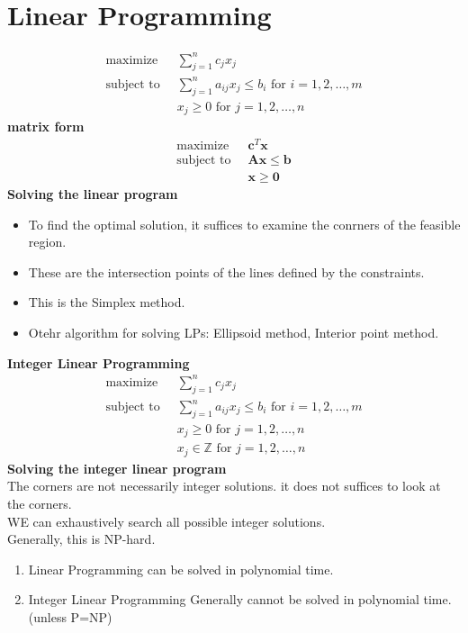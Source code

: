 \documentclass[onecolumn]{report}
\begin{document}
\section{Linear Programming}
\begin{align*}
    \text{maximize  } \:& \sum_{j=1}^n c_jx_j\\
    \text{subject to  } \:& \sum_{j=1}^n a_{ij}x_j \leq b_i \text{ for } i=1, 2, \dots, m\\
    & x_j \geq 0 \text{ for } j=1, 2, \dots, n
\end{align*}
\textbf{matrix form}
\begin{align*}
    \text{maximize  } \:& \mathbf{c}^T\mathbf{x}\\
    \text{subject to  } \:& \mathbf{Ax} \leq \mathbf{b}\\
    & \mathbf{x} \geq \mathbf{0}
\end{align*}
\noindent
\textbf{Solving the linear program}
\begin{itemize}
    \item To find the optimal solution, it suffices to examine the conrners of the feasible region.
    \item These are the intersection points of the lines defined by the constraints.
    \item This is the Simplex method.
    \item Otehr algorithm for solving LPs: Ellipsoid method, Interior point method.
\end{itemize}
\textbf{Integer Linear Programming}\\
\begin{align*}
    \text{maximize  } \:& \sum_{j=1}^n c_jx_j\\
    \text{subject to  } \:& \sum_{j=1}^n a_{ij}x_j \leq b_i \text{ for } i=1, 2, \dots, m\\
    & x_j \geq 0 \text{ for } j=1, 2, \dots, n\\
    & x_j \in \mathbb{Z} \text{ for } j=1, 2, \dots, n
\end{align*}
\textbf{Solving the integer linear program}\\
The corners are not necessarily integer solutions. it does not suffices to look at the corners.\\
WE can exhaustively search all possible integer solutions.\\
Generally, this is NP-hard.\\

\begin{enumerate}
    \item Linear Programming can be solved in polynomial time.
    \item Integer Linear Programming Generally cannot be solved in polynomial time.(unless P=NP)
\end{enumerate}
\end{document}
